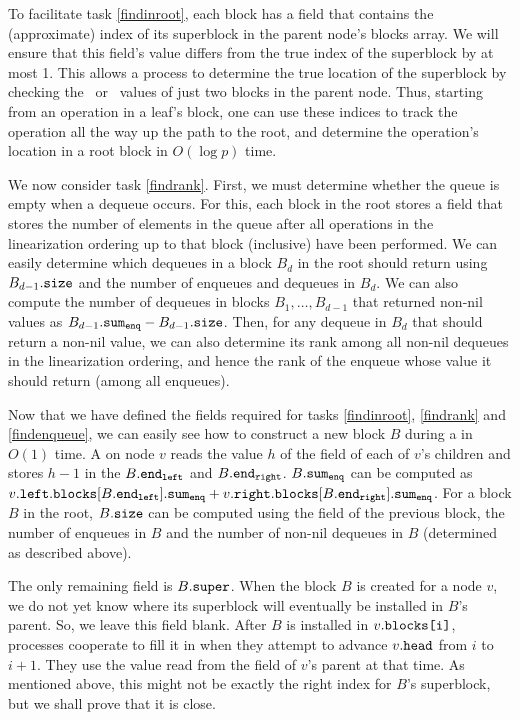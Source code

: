 To facilitate task \ref{findinroot}, each block has a field  that contains
the (approximate) index of its superblock in the parent node's blocks array.
We will ensure that this field's value differs from the true index of the superblock by at most 1.
This allows a process to determine the true location of the superblock by checking the \eleft\ or \eright\ values of just two blocks in the parent node.
Thus, starting from an operation in a leaf's block, one can use these indices to track the 
operation all the way up the path to the root, and determine the operation's location in a root block
in $O(\log p)$ time.

We now consider task \ref{findrank}.
First, we must determine whether the queue is empty when a dequeue occurs.
For this, each block in the root stores a  field that stores the number of elements
in the queue after all operations in the linearization ordering up to that block (inclusive) 
have been performed.
We can easily determine which dequeues in a block $B_d$ in the root should return \nil using
$B_{d-1}.{\normalfont{\texttt{size}}}$ and the number of enqueues and dequeues in $B_d$.
We can also compute the number of dequeues in blocks $B_1, \ldots, B_{d-1}$ that returned non-nil
values as $B_{d-1}.{\normalfont{\texttt{sum\textsubscript{enq}}}}-B_{d-1}.{\normalfont{\texttt{size}}}$.
Then, for any dequeue in $B_d$ that should return a non-nil value, we can also determine its
rank among all non-nil dequeues in the linearization ordering, and hence the rank of the enqueue
whose value it should return (among all enqueues).

Now that we have defined the fields required for tasks \ref{findinroot}, \ref{findrank} and \ref{findenqueue},
we can easily see how to construct a new block $B$ during a  in $O(1)$ time.
A  on node $v$ reads the value $h$ of the  field of each of $v$'s children and stores 
$h-1$ in the $B.{\normalfont{\texttt{end\textsubscript{left}}}}$ and $B.{\normalfont{\texttt{end\textsubscript{right}}}}$.
$B.{\normalfont{\texttt{sum\textsubscript{enq}}}}$ can be computed as $v.{\normalfont{\texttt{left}}}.{\normalfont{\texttt{blocks}}}[B.{\normalfont{\texttt{end\textsubscript{left}}}}].{\normalfont{\texttt{sum\textsubscript{enq}}}} + v.{\normalfont{\texttt{right}}}.{\normalfont{\texttt{blocks}}}[B.{\normalfont{\texttt{end\textsubscript{right}}}}].{\normalfont{\texttt{sum\textsubscript{enq}}}}$.
For a block $B$ in the root, $B.{\normalfont{\texttt{size}}}$ can be computed using the  field of the previous block,
the number of enqueues in $B$ and the number of non-nil dequeues in $B$ (determined as described above).

The only remaining field is $B.{\normalfont{\texttt{super}}}$.  When the block 
$B$ is created for a node $v$, we do not yet know where its
superblock will eventually be installed in $B$'s parent.
So, we leave this field blank.  After $B$ is installed 
in $v.{\normalfont{\texttt{blocks[i]}}}$, processes cooperate to fill it in 
when they attempt to advance $v.{\normalfont{\texttt{head}}}$ from $i$ to $i+1$.
They use the value read from the  field of $v$'s parent at that time.
As mentioned above, this might not be exactly the right index for $B$'s superblock, but we
shall prove that it is close.



